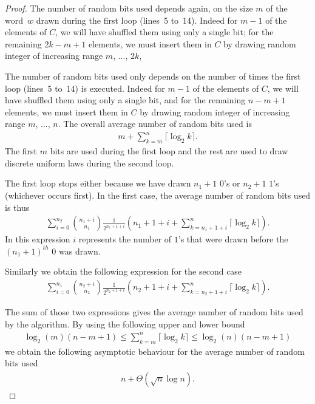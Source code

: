\documentclass[letter,11pt,en]{quick-document}
\begin{document}
\begin{proof}
The number of random bits used depends again, on the size $m$ of the
word~$w$ drawn during the first loop (lines~5 to~14). Indeed for $m-1$
of the elements of $C$, we will have shuffled them using only a single
bit; for the remaining $2k - m +1$ elements, we must insert them in $C$
by drawing random integer of increasing range $m$, ..., $2k$,

The number of random bits used only depends on the number of times the
first loop (lines~5 to~14) is executed. Indeed for $m-1$ of the elements
of $C$, we will have shuffled them using only a single bit, and for the
remaining $n - m +1$ elements, we must insert them in $C$ by drawing
random integer of increasing range $m$, ..., $n$. The overall average
number of random bits used is
\begin{align*}
m + \sum_{k=m}^n \lceil\log_2 k\rceil.
\end{align*}
The first $m$ bits are used during the first loop and the rest are used to
draw discrete uniform laws during the second loop.

The first loop stops either because we have drawn $n_1+1$ $0$'s or $n_2+1$
$1$'s (whichever occurs first). In the first case, the average number of
random bits used is thus
\begin{align*}
\sum_{i=0}^{n_2} \binom{n_1+i}{n_1} \frac{1}{2^{n_1+1+i}} \left(n_1+1+i + \sum_{k=n_1+1+i}^n \lceil\log_2 k\rceil\right).
\end{align*}
In this expression $i$ represents the number of $1$'s that were drawn before the $(n_1+1)^{th}$ $0$ was drawn.

Similarly we obtain the following expression for the second case
\begin{align*}
\sum_{i=0}^{n_1} \binom{n_2+i}{n_2} \frac{1}{2^{n_2+1+i}} \left(n_2+1+i + \sum_{k=n_2+1+i}^n \lceil\log_2 k\rceil\right).
\end{align*}

The sum of those two expressions gives the average number of random bits used by the algorithm. By using the following upper and lower bound
\begin{align*}
\log_2(m)(n-m+1) \leq \sum_{k=m}^n \lceil\log_2 k\rceil \leq \log_2(n)(n-m+1)
\end{align*}
we obtain the following asymptotic behaviour for the average number of random bits used
\begin{align*}
n + \Theta(\sqrt{n}\log n).
\end{align*}
\end{proof}
\end{document}

